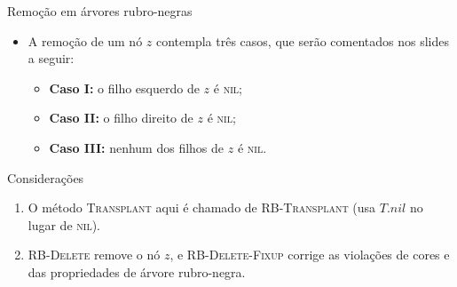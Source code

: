\documentclass[aspectratio=169,10pt]{beamer}
\newcommand{\NIL}{\textnormal{\rmfamily\textsc{nil}}}
\newcommand{\proc}[1]{\textnormal{\rmfamily\textsc{#1}}}
\newcommand{\at}[1]{.\mathit{#1}}
\begin{document}
\begin{frame}{Remoção em árvores rubro-negras}
  \begin{itemize}
    \item A remoção de um nó $z$ contempla três casos, que serão comentados nos slides a
          seguir:
      \begin{itemize}
        \item \textbf{Caso I:} o filho esquerdo de $z$ é \NIL;
        \item \textbf{Caso II:} o filho direito de $z$ é \NIL;
        \item \textbf{Caso III:} nenhum dos filhos de $z$ é \NIL.
      \end{itemize}
  \end{itemize}

  \vspace{4mm}
  \begin{block}{Considerações}
    \begin{enumerate}
      \item O método \proc{Transplant} aqui é chamado de \proc{RB-Transplant} (usa
            $T\at{nil}$ no lugar de \NIL).
      \item \proc{RB-Delete} remove o nó $z$, e \proc{RB-Delete-Fixup} corrige as
            violações de cores e das propriedades de árvore rubro-negra.
    \end{enumerate}
  \end{block}
\end{frame}
\end{document}
